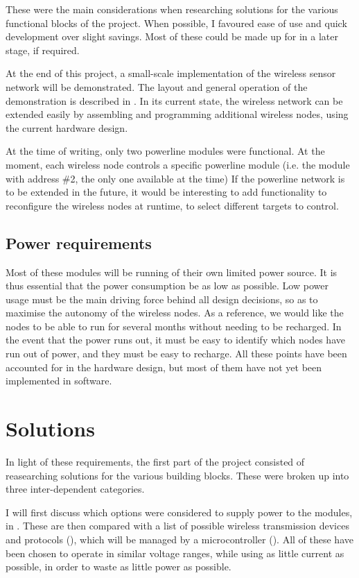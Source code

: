 These were the main considerations when researching solutions for the various
functional blocks of the project. When possible, I favoured ease of use and
quick development over slight savings. Most of these could be made up for in a
later stage, if required.

At the end of this project, a small-scale implementation of the wireless sensor
network will be demonstrated. The layout and general operation of the
demonstration is described in . In its current state,
the wireless network can be extended easily by assembling and programming
additional wireless nodes, using the current hardware design.

At the time of writing, only two powerline modules were functional. At the
moment, each wireless node controls a specific powerline module (i.e. the module
with address \#2, the only one available at the time) If the powerline network is
to be extended in the future, it would be interesting to add functionality to
reconfigure the wireless nodes at runtime, to select different targets to
control.

\subsection{Power requirements}
Most of these modules will be running of their own limited power source. It is
thus essential that the power consumption be as low as possible. Low power usage
must be the main driving force behind all design decisions, so as to maximise
the autonomy of the wireless nodes. 
As a reference, we would like the nodes to be able to run for several months
without needing to be recharged. In the event that the power runs out, it must
be easy to identify which nodes have run out of power, and they must be easy to
recharge. 
All these points have been accounted for in the hardware design, but most of
them have not yet been implemented in software. 

\section{Solutions}
In light of these requirements, the first part of the project consisted of
reasearching solutions for the various building blocks. These were broken up
into three inter-dependent categories. 

I will first discuss which options were considered to supply power to the
modules, in . These are then compared with a list of
possible wireless transmission devices and protocols (), which
will be managed by a microcontroller (). All of these
have been chosen to operate in similar voltage ranges, while using as little
current as possible, in order to waste as little power as possible.

